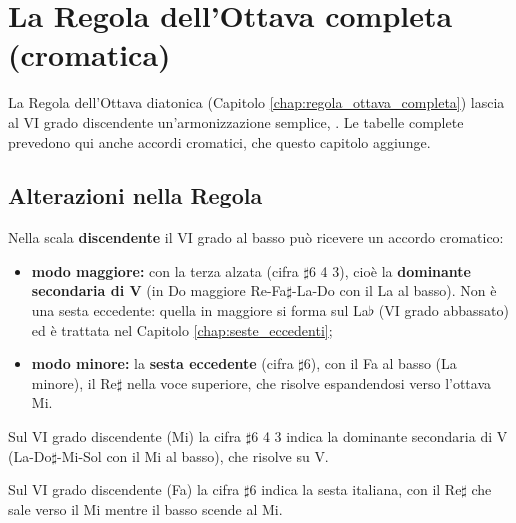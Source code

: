\chapter{La Regola dell'Ottava completa (cromatica)}
\label{chap:regola_ottava_cromatica}

La Regola dell'Ottava diatonica (Capitolo \ref{chap:regola_ottava_completa}) lascia al VI grado discendente un'armonizzazione semplice, . Le tabelle complete prevedono qui anche accordi cromatici, che questo capitolo aggiunge.

\section{Alterazioni nella Regola}
\label{sec:alterazioni_regola}

\begin{regola}
	\label{reg:regola_cromatica}
	Nella scala \textbf{discendente} il VI grado al basso può ricevere un accordo cromatico:
	\begin{itemize}
		\item \textbf{modo maggiore:}  con la terza alzata (cifra $\sharp$6 4 3), cioè la \textbf{dominante secondaria di V} (in Do maggiore Re-Fa$\sharp$-La-Do con il La al basso). Non è una sesta eccedente: quella in maggiore si forma sul La$\flat$ (VI grado abbassato) ed è trattata nel Capitolo \ref{chap:seste_eccedenti};
		\item \textbf{modo minore:} la \textbf{sesta eccedente} (cifra $\sharp$6), con il Fa al basso (La minore), il Re$\sharp$ nella voce superiore, che risolve espandendosi verso l'ottava Mi.
	\end{itemize}
\end{regola}

\begin{esempio}
	\label{ex:regola_cromatica_magg}
	Sul VI grado discendente (Mi) la cifra $\sharp$6 4 3 indica la dominante secondaria di V (La-Do$\sharp$-Mi-Sol con il Mi al basso), che risolve su V.
\end{esempio}

\begin{esempio}
	\label{ex:regola_cromatica_min}
	Sul VI grado discendente (Fa) la cifra $\sharp$6 indica la sesta italiana, con il Re$\sharp$ che sale verso il Mi mentre il basso scende al Mi.
\end{esempio}

